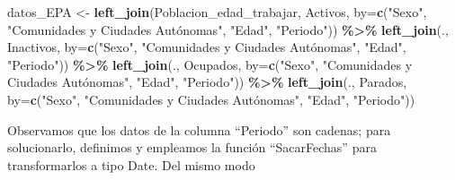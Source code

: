 \documentclass[notspecified,article,submit,moreauthors,pdftex]{Definitions/mdpi}
\newenvironment{Shaded}{\begin{snugshade}}{\end{snugshade}}
\newcommand{\AttributeTok}[1]{\textcolor[rgb]{0.13,0.29,0.53}{#1}}
\newcommand{\CommentTok}[1]{\textcolor[rgb]{0.56,0.35,0.01}{\textit{#1}}}
\newcommand{\FunctionTok}[1]{\textcolor[rgb]{0.13,0.29,0.53}{\textbf{#1}}}
\newcommand{\NormalTok}[1]{#1}
\newcommand{\OtherTok}[1]{\textcolor[rgb]{0.56,0.35,0.01}{#1}}
\newcommand{\SpecialCharTok}[1]{\textcolor[rgb]{0.81,0.36,0.00}{\textbf{#1}}}
\newcommand{\StringTok}[1]{\textcolor[rgb]{0.31,0.60,0.02}{#1}}
\begin{document}
\begin{Shaded}
\begin{Highlighting}[]
\NormalTok{datos\_EPA }\OtherTok{\textless{}{-}} \FunctionTok{left\_join}\NormalTok{(Poblacion\_edad\_trabajar, Activos, }\AttributeTok{by=}\FunctionTok{c}\NormalTok{(}\StringTok{"Sexo"}\NormalTok{, }\StringTok{"Comunidades y Ciudades Autónomas"}\NormalTok{, }\StringTok{"Edad"}\NormalTok{, }\StringTok{"Periodo"}\NormalTok{)) }\SpecialCharTok{\%\textgreater{}\%}
                \FunctionTok{left\_join}\NormalTok{(., Inactivos, }\AttributeTok{by=}\FunctionTok{c}\NormalTok{(}\StringTok{"Sexo"}\NormalTok{, }\StringTok{"Comunidades y Ciudades Autónomas"}\NormalTok{, }\StringTok{"Edad"}\NormalTok{, }\StringTok{"Periodo"}\NormalTok{)) }\SpecialCharTok{\%\textgreater{}\%}
                \FunctionTok{left\_join}\NormalTok{(., Ocupados, }\AttributeTok{by=}\FunctionTok{c}\NormalTok{(}\StringTok{"Sexo"}\NormalTok{, }\StringTok{"Comunidades y Ciudades Autónomas"}\NormalTok{, }\StringTok{"Edad"}\NormalTok{, }\StringTok{"Periodo"}\NormalTok{)) }\SpecialCharTok{\%\textgreater{}\%}
                \FunctionTok{left\_join}\NormalTok{(., Parados, }\AttributeTok{by=}\FunctionTok{c}\NormalTok{(}\StringTok{"Sexo"}\NormalTok{, }\StringTok{"Comunidades y Ciudades Autónomas"}\NormalTok{, }\StringTok{"Edad"}\NormalTok{, }\StringTok{"Periodo"}\NormalTok{))}
\end{Highlighting}
\end{Shaded}

Observamos que los datos de la columna ``Periodo'' son cadenas; para
solucionarlo, definimos y empleamos la función ``SacarFechas'' para
transformarlos a tipo Date. Del mismo modo

\begin{Shaded}
\end{Shaded}
\end{document}

